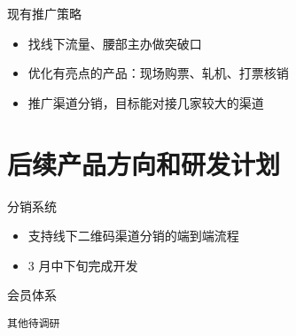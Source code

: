 \documentclass[presentation, bigger]{beamer}
\begin{document}
\begin{frame}[label={sec:orgd189554}]{现有推广策略}
\begin{itemize}
\item 找线下流量、腰部主办做突破口
\item 优化有亮点的产品：现场购票、轧机、打票核销
\item 推广渠道分销，目标能对接几家较大的渠道
\end{itemize}
\end{frame}


\section{后续产品方向和研发计划}
\label{sec:orgc57c86b}
\begin{frame}[label={sec:org97724ac}]{分销系统}
\begin{itemize}
\item 支持线下二维码渠道分销的端到端流程
\item 3 月中下旬完成开发
\end{itemize}
\end{frame}
\begin{frame}[label={sec:orgc54a5bd}]{会员体系}
\end{frame}
\begin{frame}[fragile,label={sec:org9a647d6}]{\texttt{其他待调研}}
\end{frame}
\end{document}
